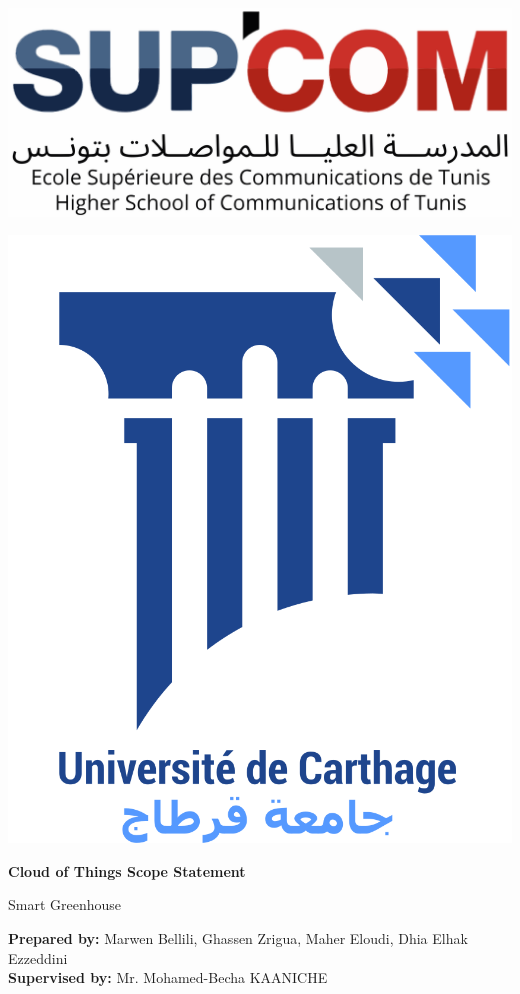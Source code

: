 \documentclass{report}
\begin{document}
\begin{titlepage}
    \centering

    \noindent %
    \begin{minipage}{0.5\textwidth}
        \includegraphics[width=0.5\linewidth]{images/logo_supcom.png} %
    \end{minipage}%
    \hfill %
    \begin{minipage}{0.5\textwidth}
        \flushright %
        \includegraphics[width=0.3\linewidth]{images/univ_carthage.png} %
    \end{minipage}

    \vspace*{2cm} %
    {\Huge\bfseries Cloud of Things Scope Statement \par}
    \vspace{1cm}
    {\huge Smart Greenhouse\par}
    \vspace{2cm}
   \begin{center}
{\LARGE \textbf{Prepared by:} Marwen Bellili, Ghassen Zrigua, Maher Eloudi, Dhia Elhak Ezzeddini}\\[0.5cm]

{\LARGE \textbf{Supervised by:} Mr. Mohamed-Becha KAANICHE}
\end{center}


\end{titlepage}
\end{document}
